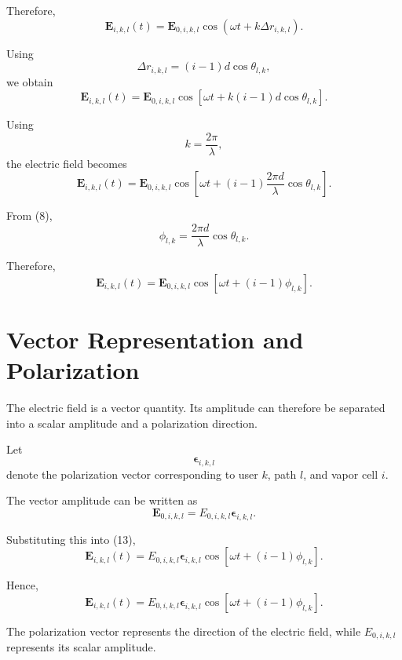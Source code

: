 \documentclass[12pt,a4paper]{article}
\begin{document}
Therefore,
\begin{equation}
\mathbf E_{i,k,l}(t)
=
\mathbf E_{0,i,k,l}
\cos
\left(
\omega t+k\Delta r_{i,k,l}
\right).
\tag{12}
\end{equation}

Using
\[
\Delta r_{i,k,l}
=
(i-1)d\cos\theta_{l,k},
\]
we obtain
\[
\mathbf E_{i,k,l}(t)
=
\mathbf E_{0,i,k,l}
\cos
\left[
\omega t
+
k(i-1)d\cos\theta_{l,k}
\right].
\]

Using
\[
k=\frac{2\pi}{\lambda},
\]
the electric field becomes
\[
\mathbf E_{i,k,l}(t)
=
\mathbf E_{0,i,k,l}
\cos
\left[
\omega t
+
(i-1)
\frac{2\pi d}{\lambda}
\cos\theta_{l,k}
\right].
\]

From (8),
\[
\phi_{l,k}
=
\frac{2\pi d}{\lambda}
\cos\theta_{l,k}.
\]

Therefore,
\begin{equation}
\boxed{
\mathbf E_{i,k,l}(t)
=
\mathbf E_{0,i,k,l}
\cos
\left[
\omega t+(i-1)\phi_{l,k}
\right].
}
\tag{13}
\end{equation}

\section{Vector Representation and Polarization}

The electric field is a vector quantity. Its amplitude can therefore
be separated into a scalar amplitude and a polarization direction.

Let
\[
\boldsymbol{\epsilon}_{i,k,l}
\]
denote the polarization vector corresponding to user \(k\),
path \(l\), and vapor cell \(i\).

The vector amplitude can be written as
\[
\mathbf E_{0,i,k,l}
=
E_{0,i,k,l}
\boldsymbol{\epsilon}_{i,k,l}.
\]

Substituting this into (13),
\[
\mathbf E_{i,k,l}(t)
=
E_{0,i,k,l}
\boldsymbol{\epsilon}_{i,k,l}
\cos
\left[
\omega t+(i-1)\phi_{l,k}
\right].
\]

Hence,
\begin{equation}
\boxed{
\mathbf E_{i,k,l}(t)
=
E_{0,i,k,l}
\boldsymbol{\epsilon}_{i,k,l}
\cos
\left[
\omega t+(i-1)\phi_{l,k}
\right].
}
\tag{14}
\end{equation}

The polarization vector represents the direction of the electric
field, while \(E_{0,i,k,l}\) represents its scalar amplitude.
\end{document}
